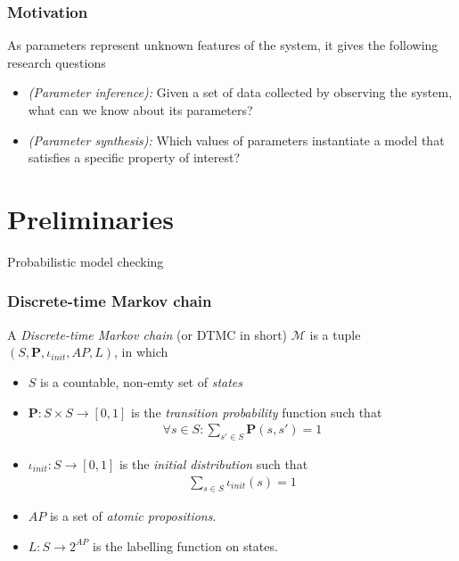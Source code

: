 \documentclass{beamer}
\begin{document}
\begin{frame}
    \frametitle{Motivation}
    As parameters represent unknown features of the system, it gives the following research
    questions
    \begin{itemize}
        \item \textit{(Parameter inference):} Given a set of data collected by observing the system,
              what can we know about its parameters?
        \item \textit{(Parameter synthesis):} Which values of parameters instantiate a model that
              satisfies a specific property of interest?
    \end{itemize}
\end{frame}

\section{Preliminaries}
\begin{frame}
    \begin{center}
        \Huge Probabilistic model checking
    \end{center}
\end{frame}

\begin{frame}
    \frametitle{Discrete-time Markov chain}
    \footnotesize {
        \begin{definition}
            \rm
            A \textit{Discrete-time Markov chain} (or DTMC in short) $\mathcal{M}$ is a tuple
            $(S,\mathbf{P}, \iota_{init}, AP, L)$, in which
            \begin{itemize}
                \item $S$ is a countable, non-emty set of \textit{states}
                \item $\mathbf{P}:S\times S \rightarrow [0,1]$ is the \textit{transition probability}
                      function such that
                      \begin{align*}
                          \forall s \in S : \sum_{s'\in S}\mathbf{P}(s, s') = 1
                      \end{align*}
                \item $\iota_{init}: S \rightarrow [0,1]$ is the \textit{initial distribution} such that
                      \begin{align*}
                          \sum_{s\in S} \iota_{init}(s) = 1
                      \end{align*}
                \item $AP$ is a set of \textit{atomic propositions}.
                \item $L: S \rightarrow 2^{AP}$ is the labelling function on states.
            \end{itemize}
        \end{definition}
    }
\end{frame}
\end{document}
